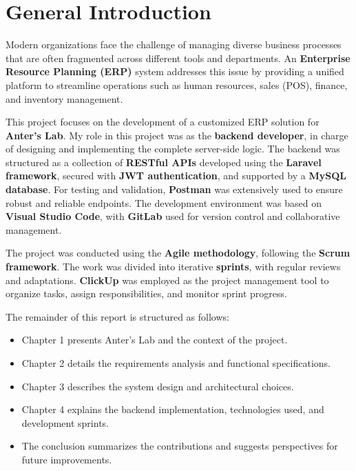 \section*{General Introduction}

Modern organizations face the challenge of managing diverse business processes that are often fragmented across different tools and departments.  
An \textbf{Enterprise Resource Planning (ERP)} system addresses this issue by providing a unified platform to streamline operations such as human resources, sales (POS), finance, and inventory management.  

This project focuses on the development of a customized ERP solution for \textbf{Anter's Lab}.  
My role in this project was as the \textbf{backend developer}, in charge of designing and implementing the complete server-side logic.  
The backend was structured as a collection of \textbf{RESTful APIs} developed using the \textbf{Laravel framework}, secured with \textbf{JWT authentication}, and supported by a \textbf{MySQL database}.  
For testing and validation, \textbf{Postman} was extensively used to ensure robust and reliable endpoints.  
The development environment was based on \textbf{Visual Studio Code}, with \textbf{GitLab} used for version control and collaborative management.  

The project was conducted using the \textbf{Agile methodology}, following the \textbf{Scrum framework}. The work was divided into iterative \textbf{sprints}, with regular reviews and adaptations.  
\textbf{ClickUp} was employed as the project management tool to organize tasks, assign responsibilities, and monitor sprint progress.  

The remainder of this report is structured as follows:
\begin{itemize}
    \item Chapter 1 presents Anter's Lab and the context of the project.
    \item Chapter 2 details the requirements analysis and functional specifications.
    \item Chapter 3 describes the system design and architectural choices.
    \item Chapter 4 explains the backend implementation, technologies used, and development sprints.
    \item The conclusion summarizes the contributions and suggests perspectives for future improvements.
\end{itemize}

